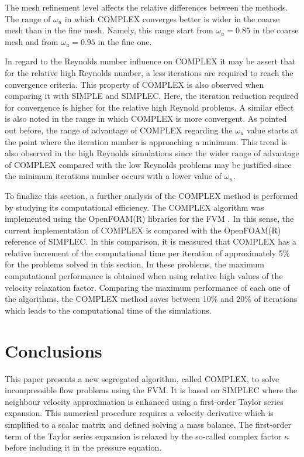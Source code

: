 \documentclass[final,3p,times,11pt,onecolumn]{myElsarticle}
\numberwithin{equation}{section}
\begin{document}
The mesh refinement level affects the relative differences between the methods. The range of $\omega_u$ in which COMPLEX converges better is wider in the coarse mesh than in the fine mesh. Namely, this range start from $\omega_u = 0.85$ in the coarse mesh and from $\omega_u = 0.95$ in the fine one.

In regard to the Reynolds number influence on COMPLEX it may be assert that for the relative high Reynolds number, a less iterations are required to reach the convergence criteria. This property of COMPLEX is also observed when comparing it with SIMPLE and SIMPLEC. Here, the iteration reduction required for convergence is higher for the relative high Reynold problems. A similar effect is also noted in the range in which COMPLEX is more convergent. As pointed out before, the range of advantage of COMPLEX regarding the $\omega_u$ value starts at the point where the iteration number is approaching a minimum. This trend is also observed in the high Reynolds simulations since the wider range of advantage of COMPLEX compared with the low Reynolds problems may be justified since the minimum iterations number occurs with a lower value of $\omega_u$.


To finalize this section, a further analysis of the COMPLEX method is performed by studying its computational efficiency. The  COMPLEX algorithm was implemented using the OpenFOAM(R)  libraries for the FVM \cite{ofpg}. In this sense, the current implementation of COMPLEX is compared with the OpenFOAM(R) reference of SIMPLEC. In this comparison, it is measured that COMPLEX  has a relative increment of the computational time per iteration of approximately 5$\%$  for the problems solved in this section. In these problems, the maximum computational performance is obtained when using relative high values of the velocity relaxation factor. Comparing the maximum performance of each one of the algorithms, the COMPLEX method saves between 10$\%$ and 20$\%$ of iterations which leads to the computational time of the simulations.


\section{Conclusions}
\label{sec:conclusions}
This paper presents a new segregated algorithm, called COMPLEX, to solve incompressible flow problems using the FVM. It is based on SIMPLEC where the neighbour velocity approximation is enhanced using a first-order Taylor series expansion. This numerical procedure requires a velocity derivative which is simplified to a scalar matrix and defined solving a mass balance. The first-order term of the Taylor series expansion is relaxed by the so-called complex factor $\kappa$ before including it in the pressure equation.  
\end{document}
